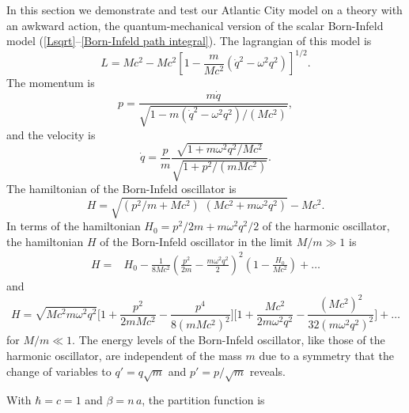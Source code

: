 \documentclass[prd,preprint,floatfix,showpacs]{revtex4-1}
\begin{document}
In this section we demonstrate
and test our Atlantic City model
on a theory with an awkward action,
the quantum-mechanical version of
the scalar Born-Infeld model
(\ref {Lsqrt}--\ref {Born-Infeld path integral})\@.
The lagrangian of this model is
\begin{equation}
L = {} Mc^2 - Mc^2 \left[ 1 - \frac{m}{Mc^2} 
\left( \dot q^2 - \omega^2 q^2 \right) \right]^{1/2} .
\label {Born-Infeld qm L}
\end{equation}
The momentum is
\begin{equation}
p ={} \frac{m \dot q}
{\sqrt{1 - m\left( \dot q^2 - \omega^2 q^2 \right)/(Mc^2) }} ,
\label {The momentum is}
\end{equation}
and the velocity is
\begin{equation}
\dot q ={} \frac{p}{m} \frac{\sqrt{1 + m \omega^2 q^2 /Mc^2}}
{\sqrt{1 + p^2/(mMc^2)}} .
\label {velocity}
\end{equation}
The hamiltonian of the Born-Infeld 
oscillator is
\begin{equation}
H ={} \sqrt{ \left( p^2/m + Mc^2 \right) \,\,
\left( Mc^2 + m \omega^2 q^2 \right) } - Mc^2 .
\label {Born-Infeld hamiltonian}
\end{equation}
In terms of the hamiltonian
\( H_0 = p^2/2m + m \omega^2 q^2/2 \)
of the harmonic oscillator,
the hamiltonian \( H \) of the Born-Infeld 
oscillator in the limit \( M/m \gg 1 \) is
\begin{equation}
   \begin{split}
H ={}& H_0 - \frac{1}{8Mc^2} 
 \left(\frac{p^2}{2m} - \frac{m\omega^2 q^2}{2} \right)^2
 \left( 1 - \frac{H_0}{Mc^2} \right) + \dots
\label {When M >> m, the first few terms of the hamiltonian}
   \end{split}
\end{equation}
and
\begin{equation}
H={} \sqrt{Mc^2m\omega^2q^2}
\Big[1+\frac{p^2}{2mMc^2} -  \frac{p^4}{8(mMc^2)^2} \Big]
\Big[1 + \frac{Mc^2}{2m\omega^2 q^2} - \frac{(Mc^2)^2}{32(m\omega^2q^2)^2} \Big] + \dots
\end{equation}
for \( M/m \ll 1 \)\@.
The energy levels of the Born-Infeld oscillator, 
like those of the harmonic oscillator, 
are independent of the mass \( m \)
due to a symmetry that the
change of variables to
\( q' = q \sqrt{m} \) and \( p' = p/\sqrt{m} \)
reveals.
\par
With \( \hbar = c = 1 \) and \( \beta = n \, a \),
the partition function is 
\end{document}
